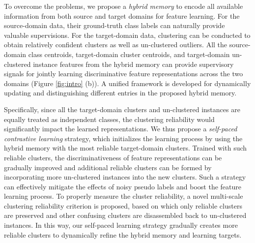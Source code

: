 \documentclass{article}
\begin{document}
To overcome the problems, we propose a \textit{hybrid memory} to encode all available information from both source and target domains for feature learning. 
For the source-domain data, their ground-truth class labels can naturally provide valuable supervisions. 
For the target-domain data, clustering can be conducted to obtain relatively confident clusters as well as un-clustered outliers. 
All the source-domain class centroids, target-domain cluster centroids, and target-domain un-clustered instance features from the hybrid memory can provide supervisory signals for jointly learning discriminative feature representations across the two domains (Figure \ref{fig:intro} (b)). 
A unified framework is developed for dynamically updating and distinguishing different entries in the proposed hybrid memory.

Specifically, since all the target-domain clusters and un-clustered instances are equally treated as independent classes, the clustering reliability would significantly impact the learned representations. 
We thus propose a \textit{self-paced contrastive learning} strategy, which initializes the learning process by using the hybrid memory with the most reliable target-domain clusters.
Trained with such reliable clusters, the discriminativeness of feature representations can be gradually improved and additional reliable clusters can be formed by incorporating more un-clustered instances into the new clusters.
Such a strategy can effectively mitigate the effects of noisy pseudo labels and boost the feature learning process.
To properly measure the cluster reliability, a novel multi-scale clustering reliability criterion is proposed, based on which only reliable clusters are preserved and other confusing clusters are disassembled back to un-clustered instances.
In this way,
our self-paced learning strategy gradually creates more reliable clusters to dynamically refine the hybrid memory and learning targets.
\end{document}
